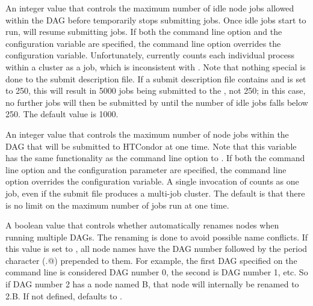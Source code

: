 \begin{description}
\label{param:DAGManMaxJobsIdle}
\item[\Macro{DAGMAN\_MAX\_JOBS\_IDLE}]
  An integer value that controls the maximum number of idle node jobs
  allowed within the DAG before  temporarily stops
  submitting jobs.  Once idle jobs start to run,  will
  resume submitting jobs.  If both the command line option and the
  configuration variable are specified, the command line option overrides
  the configuration variable.  Unfortunately,
   currently counts each individual
  process within a cluster as a job, which is inconsistent with
  .
  Note that nothing special is 
  done to the submit description file.
  If a submit description file contains 
  and  is set to 250, 
  this will result in 5000 jobs being submitted to the ,
  not 250; in this case, no
  further jobs will then be submitted by  until the number of
  idle jobs falls below 250.
  The default value is 1000.

\label{param:DAGManMaxJobsSubmitted}
\item[\Macro{DAGMAN\_MAX\_JOBS\_SUBMITTED}]
  An integer value that controls the maximum number of node jobs within the
  DAG that will  be submitted to HTCondor at one time.  Note that this
  variable has the same functionality as the  
  command line option to .
  If both the command line option and the
  configuration parameter are specified, the command line option overrides
  the configuration variable.  A single invocation of 
  counts as one job, even if the submit file produces a multi-job cluster.
  The default is that there is no limit on the maximum number of jobs
  run at one time.

\label{param:DAGManMungeNodeNames}
\item[\Macro{DAGMAN\_MUNGE\_NODE\_NAMES}]
  A boolean value that controls whether  automatically
  renames nodes when running multiple DAGs.
  The renaming is done to avoid possible name conflicts.
  If this value is set to ,
  all node names have the DAG number followed by the period character
  (\verb@.@) prepended to them.
  For example, the first DAG specified on the 
  command line is considered DAG number 0, the second is DAG number 1, etc.
  So if DAG number 2 has a node named B,
  that node will internally be renamed to 2.B.
  If not defined,  defaults to .


\end{description}
